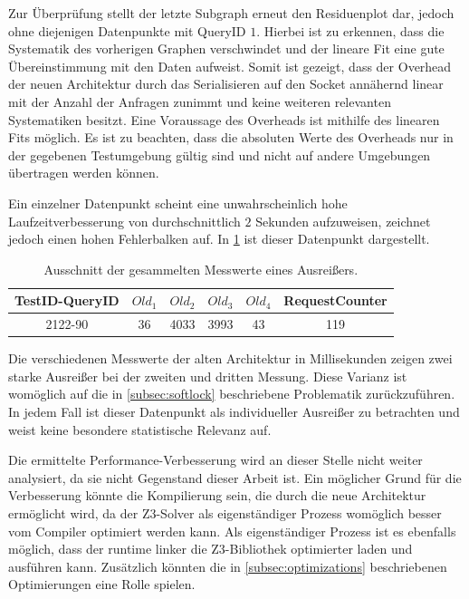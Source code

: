 Zur Überprüfung stellt der letzte Subgraph erneut den Residuenplot dar, jedoch ohne diejenigen Datenpunkte mit QueryID $1$.
Hierbei ist zu erkennen, dass die Systematik des vorherigen Graphen verschwindet und der lineare Fit eine gute Übereinstimmung mit den Daten aufweist.
Somit ist gezeigt, dass der Overhead der neuen Architektur durch das Serialisieren auf den Socket annähernd linear mit der Anzahl der Anfragen zunimmt
und keine weiteren relevanten Systematiken besitzt. Eine Voraussage des Overheads ist mithilfe des linearen Fits möglich.
Es ist zu beachten, dass die absoluten Werte des Overheads nur in der gegebenen Testumgebung gültig sind und nicht auf andere Umgebungen übertragen werden können.

Ein einzelner Datenpunkt scheint eine unwahrscheinlich hohe Laufzeitverbesserung von durchschnittlich $2$ Sekunden aufzuweisen, zeichnet jedoch einen hohen Fehlerbalken auf.
In \cref{tab:broken-datapoint} ist dieser Datenpunkt dargestellt.

\begin{table}[!htp]
    \centering
    \caption{Ausschnitt der gesammelten Messwerte eines Ausreißers.}
    \label{tab:broken-datapoint}
    \begin{tabular}{ cccccc }
        \toprule
        \textbf{TestID-QueryID} & \textbf{$Old_1$} & \textbf{$Old_2$} & \textbf{$Old_3$} & \textbf{$Old_4$} & \textbf{RequestCounter} \\
        \midrule
        2122-90                 & 36               & 4033             & 3993             & 43                & 119                    \\
        \bottomrule
    \end{tabular}
\end{table}
\FloatBarrier

Die verschiedenen Messwerte der alten Architektur in Millisekunden zeigen zwei starke Ausreißer bei der zweiten und dritten Messung.
Diese Varianz ist womöglich auf die in \cref{subsec:softlock} beschriebene Problematik zurückzuführen.
In jedem Fall ist dieser Datenpunkt als individueller Ausreißer zu betrachten und weist keine besondere statistische Relevanz auf.

Die ermittelte Performance-Verbesserung wird an dieser Stelle nicht weiter analysiert, da sie nicht Gegenstand dieser Arbeit ist.
Ein möglicher Grund für die Verbesserung könnte die Kompilierung sein, die durch die neue Architektur ermöglicht wird,
da der Z3-Solver als eigenständiger Prozess womöglich besser vom Compiler optimiert werden kann.
Als eigenständiger Prozess ist es ebenfalls möglich, dass der runtime linker die Z3-Bibliothek optimierter laden und ausführen kann.
Zusätzlich könnten die in \cref{subsec:optimizations} beschriebenen Optimierungen eine Rolle spielen.
